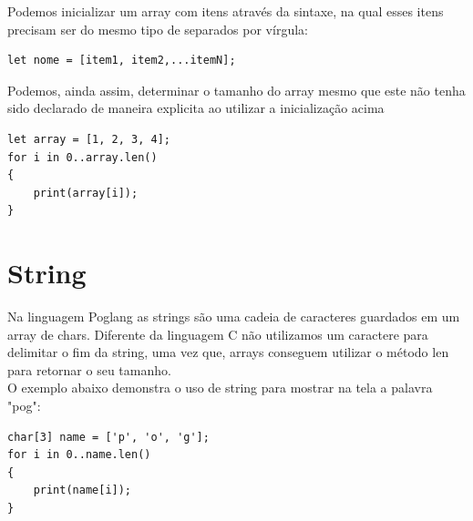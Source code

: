 \documentclass[12pt, letterpaper]{article}
\newcommand\tab[1][1cm]{\hspace*{#1}}
\begin{document}
\begin{spacing}{1.5}
\end{spacing}

\tab Podemos inicializar um array com itens através da sintaxe, na qual esses itens
precisam ser do mesmo tipo de separados por vírgula:

\begin{spacing}{1.5}
\end{spacing}

\begin{lstlisting}[caption=Exemplo inicialização de array com let]
let nome = [item1, item2,...itemN];
\end{lstlisting}

\begin{spacing}{1.5}
\end{spacing}

\tab Podemos, ainda assim, determinar o tamanho do array mesmo que este não tenha sido declarado
de maneira explicita ao utilizar a inicialização acima\\[1.0mm]

\begin{spacing}{1.5}
\end{spacing}

\begin{lstlisting}[caption=Exemplo do .len()]
let array = [1, 2, 3, 4];
for i in 0..array.len() 
{
    print(array[i]);
}
\end{lstlisting}

\begin{spacing}{1.5}
\end{spacing}

\section{String}
\tab Na linguagem Poglang as strings são uma cadeia de caracteres guardados em um array de chars.
Diferente da linguagem C não utilizamos um caractere para delimitar o fim da string,
uma vez que, arrays conseguem utilizar o método len para retornar o seu tamanho.\\[1.0mm]
\tab O exemplo abaixo demonstra o uso de string para mostrar na tela a
palavra "pog":

\begin{spacing}{1.5}
\end{spacing}

\begin{lstlisting}[caption=Exemplo string]
char[3] name = ['p', 'o', 'g'];
for i in 0..name.len()
{
    print(name[i]);
}
\end{lstlisting}
\end{document}
